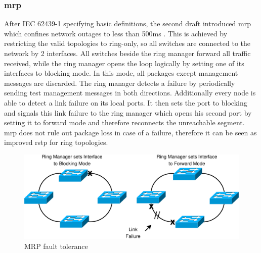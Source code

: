 \subsubsection{\gls{mrp}}
After IEC 62439-1 specifying basic definitions, the second draft introduced \gls{mrp} which confines network outages to less than 500ms \cite{6145654}.
This is achieved by restricting the valid topologies to ring-only, so all switches are connected to the network by 2 interfaces. All switches beside the ring manager
forward all traffic received, while the ring manager opens the loop logically by setting one of its interfaces to blocking mode.
In this mode, all packages except management messages are discarded. The ring manager detects a failure by periodically sending test management messages in both
directions. Additionally every node is able to detect a link failure on its local ports. It then sets the port to blocking and signals this link failure to the
ring manager which opens his second port by setting it to forward mode and therefore reconnects the unreachable segment.
\\
\gls{mrp} does not rule out package loss in case of a failure, therefore it can be seen as improved \gls{rstp} for ring topologies. 

\begin{figure}[H]
 \includegraphics[width=\linewidth]{figures/MRP2.eps}
 \caption{MRP fault tolerance}
\label{fig:mrp1}
\end{figure}


